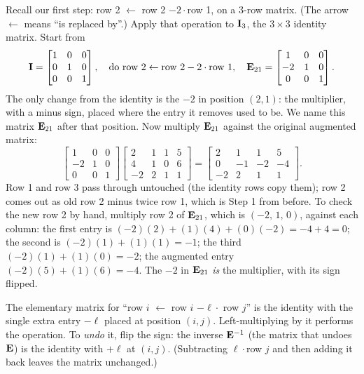Recall our first step: row 2 $\leftarrow$ row 2 $- 2\cdot$row 1, on a
$3$-row matrix. (The arrow $\leftarrow$ means ``is replaced by''.) Apply that
operation to $\mathbf{I}_3$, the $3\times 3$ identity matrix. Start from
\[
\mathbf{I}=\begin{bmatrix}1&0&0\\0&1&0\\0&0&1\end{bmatrix},
\quad\text{do row 2}\leftarrow\text{row 2}-2\cdot\text{row 1}, \quad
\mathbf{E}_{21}=\begin{bmatrix}1&0&0\\-2&1&0\\0&0&1\end{bmatrix}.
\]
The only change from the identity is the $-2$ in position $(2,1)$: the
multiplier, with a minus sign, placed where the entry it removes used to
be. We name this matrix $\mathbf{E}_{21}$ after that position. Now multiply
$\mathbf{E}_{21}$ against the original augmented matrix:
\[
\begin{bmatrix}1&0&0\\-2&1&0\\0&0&1\end{bmatrix}
\left[\begin{array}{ccc|c}
2 & 1 & 1 & 5\\
4 & 1 & 0 & 6\\
-2 & 2 & 1 & 1
\end{array}\right]
=
\left[\begin{array}{ccc|c}
2 & 1 & 1 & 5\\
0 & -1 & -2 & -4\\
-2 & 2 & 1 & 1
\end{array}\right].
\]
Row 1 and row 3 pass through untouched (the identity rows copy them); row 2 comes
out as old row 2 minus twice row 1, which is Step 1 from before. To check
the new row 2 by hand, multiply row 2 of $\mathbf{E}_{21}$, which is $(-2,\,1,\,0)$,
against each column: the first entry is $(-2)(2) + (1)(4) + (0)(-2) = -4 + 4 = 0$;
the second is $(-2)(1)+(1)(1) = -1$; the third $(-2)(1)+(1)(0)=-2$; the augmented
entry $(-2)(5)+(1)(6) = -4$. The $-2$ in $\mathbf{E}_{21}$ \emph{is} the multiplier,
with its sign flipped.

\begin{focusbox}
The elementary matrix for ``row $i$ $\leftarrow$ row $i$ $-\ell\cdot$ row $j$''
is the identity with the single extra entry $-\ell$ placed at position
$(i,j)$. Left-multiplying by it performs the operation. To \emph{undo} it, flip
the sign: the inverse $\mathbf{E}^{-1}$ (the matrix that undoes $\mathbf{E}$) is the
identity with $+\ell$ at $(i,j)$. (Subtracting
$\ell\cdot$row $j$ and then adding it back leaves the matrix unchanged.)
\end{focusbox}

